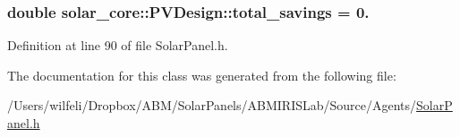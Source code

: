 \subsubsection[{total\+\_\+savings}]{\setlength{\rightskip}{0pt plus 5cm}double solar\+\_\+core\+::\+P\+V\+Design\+::total\+\_\+savings = 0.}\label{classsolar__core_1_1_p_v_design_a7628fe2e1ea95f8df79aca11dd5a356d}


Definition at line 90 of file Solar\+Panel.\+h.



The documentation for this class was generated from the following file\+:\begin{DoxyCompactItemize}
\item 
/\+Users/wilfeli/\+Dropbox/\+A\+B\+M/\+Solar\+Panels/\+A\+B\+M\+I\+R\+I\+S\+Lab/\+Source/\+Agents/\hyperlink{_solar_panel_8h}{Solar\+Panel.\+h}\end{DoxyCompactItemize}
